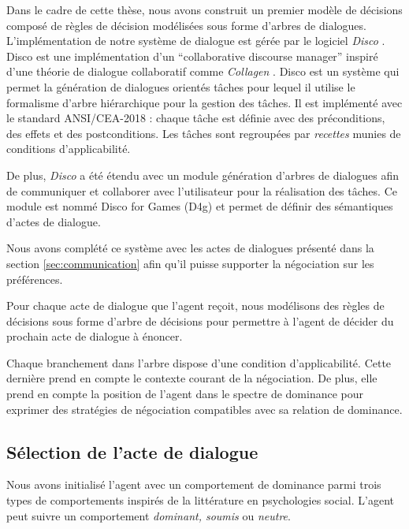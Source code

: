 Dans le cadre de cette thèse, nous avons construit un premier modèle de décisions composé de règles de décision modélisées sous forme d'arbres de dialogues. L'implémentation de notre système de dialogue est gérée par le logiciel \emph{Disco} \cite{rich09}. Disco est une implémentation d'un ``collaborative discourse manager'' inspiré d'une théorie de dialogue collaboratif comme \emph{Collagen} \cite{rich1997collagen}. Disco est un système qui permet la génération de dialogues orientés tâches pour lequel il utilise le formalisme d'arbre hiérarchique pour la gestion des tâches. Il est implémenté avec le standard ANSI/CEA-2018 : chaque tâche est définie avec des préconditions, des effets et des postconditions. Les tâches sont regroupées par \emph{recettes} munies de conditions d'applicabilité.

De plus, \emph{Disco} a été étendu avec un module génération d'arbres de dialogues afin de communiquer et collaborer avec l'utilisateur pour la réalisation des tâches. Ce module est nommé Disco for Games (D4g) et permet de définir des sémantiques d'actes de dialogue. 

Nous avons complété ce système avec les actes de dialogues présenté dans la section \ref{sec:communication} afin qu'il puisse supporter la négociation sur les préférences.

Pour chaque acte de dialogue que l'agent reçoit, nous modélisons des règles de décisions sous forme d'arbre de décisions pour permettre à l'agent de décider du prochain acte de dialogue à énoncer.

Chaque branchement dans l'arbre dispose d'une condition d'applicabilité. Cette dernière prend en compte le contexte courant de la négociation. De plus, elle prend en compte la position de l'agent dans le spectre de dominance pour exprimer des stratégies de négociation compatibles avec sa relation de dominance.



	
	
	\subsection{Sélection de l'acte de dialogue}
	Nous avons initialisé l'agent avec un comportement de dominance parmi trois types de comportements inspirés de la littérature en psychologies social.  L'agent peut suivre un comportement \emph{dominant, soumis} ou \emph{neutre}. 
	
